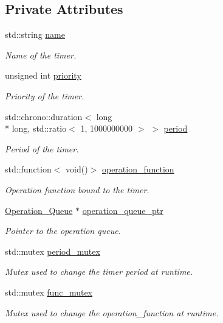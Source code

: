 \subsection*{Private Attributes}
\begin{DoxyCompactItemize}
\item 
std\-::string \hyperlink{classzcm_1_1Timer_abfd2bb014b496ce2eda5a5837e9275f1}{name}
\begin{DoxyCompactList}\small\item\em Name of the timer. \end{DoxyCompactList}\item 
unsigned int \hyperlink{classzcm_1_1Timer_a722f6390254d106117d8e1545b6092ab}{priority}
\begin{DoxyCompactList}\small\item\em Priority of the timer. \end{DoxyCompactList}\item 
std\-::chrono\-::duration$<$ long \\*
long, std\-::ratio$<$ 1, 1000000000 $>$ $>$ \hyperlink{classzcm_1_1Timer_a36c7498a7ad5706ceca83429e6c1759c}{period}
\begin{DoxyCompactList}\small\item\em Period of the timer. \end{DoxyCompactList}\item 
std\-::function$<$ void()$>$ \hyperlink{classzcm_1_1Timer_a07f820c2d67029b83547bbfd77fc3690}{operation\-\_\-function}
\begin{DoxyCompactList}\small\item\em Operation function bound to the timer. \end{DoxyCompactList}\item 
\hyperlink{classzcm_1_1Operation__Queue}{Operation\-\_\-\-Queue} $\ast$ \hyperlink{classzcm_1_1Timer_a9f2ce34fb9230c4251355fde956b7220}{operation\-\_\-queue\-\_\-ptr}
\begin{DoxyCompactList}\small\item\em Pointer to the operation queue. \end{DoxyCompactList}\item 
std\-::mutex \hyperlink{classzcm_1_1Timer_af9d6ce4df403e44b543241926ddcf41f}{period\-\_\-mutex}
\begin{DoxyCompactList}\small\item\em Mutex used to change the timer period at runtime. \end{DoxyCompactList}\item 
std\-::mutex \hyperlink{classzcm_1_1Timer_a987e7fd6128be8eac6a6a3d60c7ef9b3}{func\-\_\-mutex}
\begin{DoxyCompactList}\small\item\em Mutex used to change the operation\-\_\-function at runtime. \end{DoxyCompactList}\end{DoxyCompactItemize}


